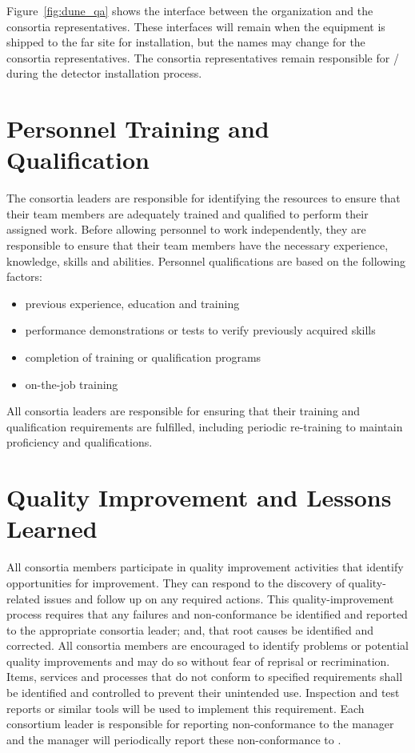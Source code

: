 Figure~\ref{fig:dune_qa} shows the interface between the
  organization and the consortia 
representatives.  These interfaces will remain when the equipment is
shipped to the far site for installation, but the names may change for
the consortia  representatives.  The consortia 
representatives remain responsible for / during the
detector installation process.


\section{Personnel Training and Qualification}

The  consortia leaders are responsible for identifying the
resources to ensure that their team members are adequately trained and
qualified to perform their assigned work. Before allowing personnel to
work independently, they are responsible to ensure that their team
members have the necessary experience, knowledge, skills and
abilities. Personnel qualifications are based on the following
factors:
\begin{itemize}
 \item previous experience, education and training
 \item performance demonstrations or tests to verify previously
   acquired skills
 \item completion of training or qualification programs
 \item on-the-job training
\end{itemize}

All  consortia leaders are responsible for ensuring that
their training and qualification requirements are fulfilled, including
periodic re-training to maintain proficiency and qualifications.


\section{Quality Improvement and Lessons Learned}
\label{sec:quality_improvement}

All  consortia members participate in quality improvement
activities that identify opportunities for improvement. They can
respond to the discovery of quality-related issues and follow up on
any required actions. This quality-improvement process requires that
any failures and non-conformance be identified and reported to the
appropriate consortia leader; and, that root causes be identified and
corrected. All consortia members are encouraged to identify problems
or potential quality improvements and may do so without fear of
reprisal or recrimination. Items, services and processes that do not
conform to specified requirements shall be identified and controlled
to prevent their unintended use. Inspection and test reports or
similar tools will be used to implement this requirement. Each
consortium leader is responsible for reporting non-conformance to the
  manager and the
  manager will periodically report
these non-conformance to  .

